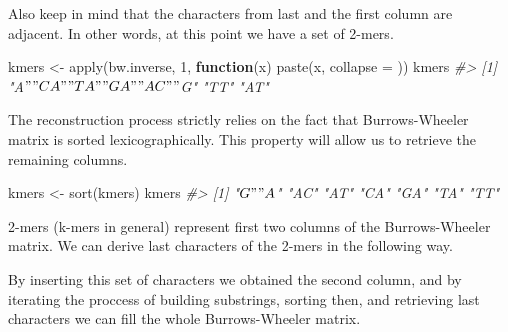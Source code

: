 \documentclass[
]{book}
\newenvironment{Shaded}{\begin{snugshade}}{\end{snugshade}}
\newcommand{\AttributeTok}[1]{\textcolor[rgb]{0.77,0.63,0.00}{#1}}
\newcommand{\CommentTok}[1]{\textcolor[rgb]{0.56,0.35,0.01}{\textit{#1}}}
\newcommand{\ConstantTok}[1]{\textcolor[rgb]{0.00,0.00,0.00}{#1}}
\newcommand{\ControlFlowTok}[1]{\textcolor[rgb]{0.13,0.29,0.53}{\textbf{#1}}}
\newcommand{\DecValTok}[1]{\textcolor[rgb]{0.00,0.00,0.81}{#1}}
\newcommand{\FunctionTok}[1]{\textcolor[rgb]{0.00,0.00,0.00}{#1}}
\newcommand{\NormalTok}[1]{#1}
\newcommand{\OtherTok}[1]{\textcolor[rgb]{0.56,0.35,0.01}{#1}}
\newcommand{\StringTok}[1]{\textcolor[rgb]{0.31,0.60,0.02}{#1}}
\begin{document}
Also keep in mind that the characters from last and the first column are adjacent. In other words, at this point we have a set of 2-mers.

\begin{Shaded}
\begin{Highlighting}[]
\NormalTok{kmers }\OtherTok{\textless{}{-}} \FunctionTok{apply}\NormalTok{(bw.inverse, }\DecValTok{1}\NormalTok{, }
               \ControlFlowTok{function}\NormalTok{(x) }\FunctionTok{paste}\NormalTok{(x, }\AttributeTok{collapse =} \StringTok{\textquotesingle{}\textquotesingle{}}\NormalTok{))}
\NormalTok{kmers}
\CommentTok{\#\textgreater{} [1] "A$" "CA" "TA" "GA" "AC" "$G" "TT" "AT"}
\end{Highlighting}
\end{Shaded}

The reconstruction process strictly relies on the fact that Burrows-Wheeler matrix is sorted lexicographically. This property will allow us to retrieve the remaining columns.

\begin{Shaded}
\begin{Highlighting}[]
\NormalTok{kmers }\OtherTok{\textless{}{-}} \FunctionTok{sort}\NormalTok{(kmers)}
\NormalTok{kmers}
\CommentTok{\#\textgreater{} [1] "$G" "A$" "AC" "AT" "CA" "GA" "TA" "TT"}
\end{Highlighting}
\end{Shaded}

2-mers (k-mers in general) represent first two columns of the Burrows-Wheeler matrix. We can derive last characters of the 2-mers in the following way.

\begin{Shaded}
\end{Shaded}

By inserting this set of characters we obtained the second column, and by iterating the proccess of building substrings, sorting then, and retrieving last characters we can fill the whole Burrows-Wheeler matrix.
\end{document}
